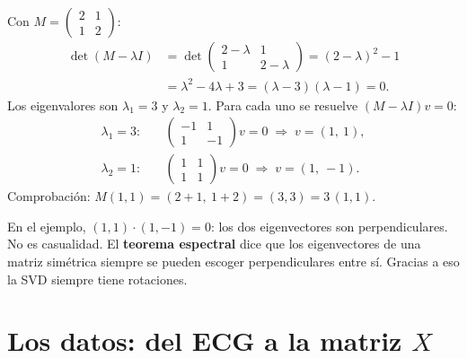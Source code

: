 \documentclass[11pt,letterpaper]{article}
\begin{document}
\begin{ejemplo}
    Con $M = \left(\begin{smallmatrix} 2 & 1 \\ 1 & 2
    \end{smallmatrix}\right)$:
    \begin{align*}
        \det(M - \lambda I)
            &= \det\begin{pmatrix} 2 - \lambda & 1 \\
                                   1 & 2 - \lambda \end{pmatrix}
             = (2 - \lambda)^2 - 1 \\
            &= \lambda^2 - 4\lambda + 3
             = (\lambda - 3)(\lambda - 1) = 0 .
    \end{align*}
    Los eigenvalores son $\lambda_1 = 3$ y $\lambda_2 = 1$. Para cada
    uno se resuelve $(M - \lambda I) v = 0$:
    \begin{align*}
        \lambda_1 = 3: &\quad
        \begin{pmatrix} -1 & 1 \\ 1 & -1 \end{pmatrix} v = 0
        \;\Rightarrow\; v = (1,\ 1) , \\
        \lambda_2 = 1: &\quad
        \begin{pmatrix} 1 & 1 \\ 1 & 1 \end{pmatrix} v = 0
        \;\Rightarrow\; v = (1,\ -1) .
    \end{align*}
    Comprobación: $M (1, 1) = (2 + 1,\ 1 + 2) = (3, 3) = 3\,(1, 1)$.
\end{ejemplo}

\begin{idea}
    En el ejemplo, $(1, 1) \cdot (1, -1) = 0$: los dos eigenvectores
    son perpendiculares. No es casualidad. El \textbf{teorema
    espectral} dice que los eigenvectores de una matriz simétrica
    siempre se pueden escoger perpendiculares entre sí. Gracias a eso
    la SVD siempre tiene rotaciones.
\end{idea}

\newpage


\section{Los datos: del ECG a la matriz $X$}
\end{document}
